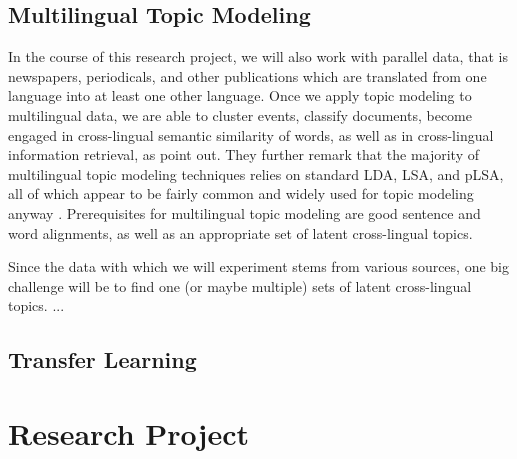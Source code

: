 \subsection{Multilingual Topic Modeling}
In the course of this research project, we will also work with parallel data, that is newspapers, periodicals, and other publications which are translated from one language into at least one other language. Once we apply topic modeling to multilingual data, we are able to cluster events, classify documents, become engaged in cross-lingual semantic similarity of words, as well as in cross-lingual information retrieval, as \citet{vulicprobabilistic2015} point out. They further remark that the majority of multilingual topic modeling techniques relies on standard LDA, LSA, and pLSA, all of which appear to be fairly common and widely used for topic modeling anyway \citep{dumaisautomatic1997,mimnopolylingual2009,zhangcrosslingual2010,nicross2011}. Prerequisites for multilingual topic modeling are good sentence and word alignments, as well as an appropriate set of latent cross-lingual topics.

Since the data with which we will experiment stems from various sources, one big challenge will be to find one (or maybe multiple) sets of latent cross-lingual topics.  ...

\subsection{Transfer Learning}

\section{Research Project}


